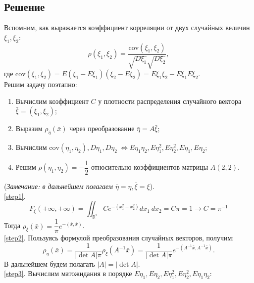 \documentclass[specialist,
substylefile = spbu_report.rtx,
subf,href,colorlinks=true, 12pt]{disser}
\newcommand{\R}{\mathbb{R}}
\begin{document}
	\subsection{Решение}
	Вспомним, как выражается коэффициент корреляции от двух случайных величин $\xi_1, \xi_2$:
	\begin{equation*}
		\rho(\xi_1,\xi_2)=\dfrac{\mathrm{cov}(\xi_1,\xi_2)}{\sqrt{D\xi_1}\sqrt{D\xi_2}},
	\end{equation*}
	где $\mathrm{cov}(\xi_1, \xi_2) = E(\xi_1 - E\xi_1)(\xi_2 - E\xi_2) = E\xi_1\xi_2 - E\xi_1E\xi_2$.\\
	Решим задачу поэтапно:
	\begin{enumerate}
		\item Вычислим коэффициент $C$ у плотности распределения случайного вектора $\bar{\xi} = (\xi_1, \xi_2)$;\label{step1}
		\item Выразим $\rho_{\bar{\eta}}(\bar{x})$ через преобразование $\bar{\eta} = A\bar{\xi}$;\label{step2}
		\item Вычислим $\mathrm{cov}(\eta_1,\eta_2), D\eta_1, D\eta_2~\Leftrightarrow E\eta_1\eta_2, E\eta_1^2, E\eta_2^2, E\eta_1, E\eta_2$;\label{step3}
		\item Решим $\rho(\eta_1, \eta_2) = -\dfrac{1}{2}$ относительно коэффициентов матрицы $A(2,2)$.\label{step4}
	\end{enumerate}
	(\textit{Замечание: в дальнейшем полагаем $\bar{\eta}=\eta, \bar{\xi}=\xi$}).\\
	\ref{step1}.
	\begin{equation*}
		F_\xi(+\infty, +\infty) = \iint_{\R^2}Ce^{-(x_1^2 + x_2^2)}dx_1~dx_2=C\pi=1\rightarrow C = \pi^{-1}
	\end{equation*}
	Тогда $\rho_\xi(\bar{x})=\dfrac{1}{\pi}e^{-(\bar{x}, \bar{x})}$.
	\\\ref{step2}. Пользуясь формулой преобразования случайных векторов, получим:
	\begin{equation*}
		\rho_\eta(\bar{x})=\dfrac{1}{|\det A|\pi}\rho_\xi(A^{-1}\bar{x}) = \dfrac{1}{|\det A|\pi}e^{-(A^{-1}\bar{x}, A^{-1}\bar{x})}.
	\end{equation*}
	В дальнейшем будем полагать $|A| = |\det A|$.
	\\\ref{step3}. Вычислим матожидания в порядке $E\eta_1, E\eta_2, E\eta_1^2, E\eta_2^2, E\eta_1\eta_2$:
\end{document}
